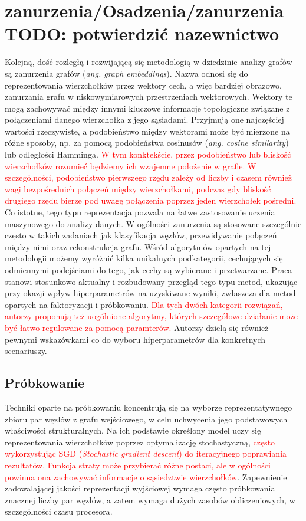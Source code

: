 \section{zanurzenia/Osadzenia/zanurzenia TODO: potwierdzić nazewnictwo}
    Kolejną, dość rozległą i rozwijającą się metodologią w dziedzinie analizy grafów są zanurzenia grafów (\emph{ang. graph embeddings}). Nazwa odnosi się do reprezentowania wierzchołków przez wektory cech, a więc bardziej obrazowo, zanurzania grafu w niskowymiarowych przestrzeniach wektorowych. Wektory te mogą zachowywać między innymi kluczowe informacje topologiczne związane z połączeniami danego wierzchołka z jego sąsiadami. Przyjmują one najczęściej wartości rzeczywiste, a podobieństwo między wektorami może być mierzone na różne sposoby, np.  za pomocą podobieństwa cosinusów (\emph{ang. cosine similarity}) lub odległości Hamminga\cite{Lian_Zheng_Zheng_Ge_Cao_Tsang_Xie_2018}. \textcolor{red}{W tym konktekście, przez podobieństwo lub bliskość wierzchołków rozumieć będziemy ich wzajemne położenie w grafie. W szczególności, podobieństwo pierwszego rzędu zależy od liczby i czasem również wagi bezpośrednich połączeń między wierzchołkami, podczas gdy bliskość drugiego rzędu bierze pod uwagę połączenia poprzez jeden wierzchołek pośredni.} Co istotne, tego typu reprezentacja pozwala na łatwe zastosowanie uczenia maszynowego do analizy danych. W ogólności zanurzenia są stosowane szczególnie często w takich zadaniach jak klasyfikacja węzłów, przewidywanie połączeń między nimi oraz rekonstrukcja grafu. Wśród algorytmów opartych na tej metodologii możemy wyróżnić kilka unikalnych podkategorii, cechujących się odmiennymi podejściami do tego, jak cechy są wybierane i przetwarzane. Praca \cite{Yang_Qu_Hussein_Rosso_Cudré-Mauroux_Liu_2023} stanowi stosunkowo aktualny i rozbudowany przegląd tego typu metod, ukazując przy okazji wpływ hiperparametrów na uzyskiwane wyniki, zwłaszcza dla metod opartych na faktoryzacji i próbkowaniu. \textcolor{red}{Dla tych dwóch kategorii rozwiązań, autorzy proponują też uogólnione algorytmy, których szczegółowe działanie może być łatwo regulowane za pomocą paramterów.} Autorzy dzielą się również pewnymi wskazówkami co do wyboru hiperparametrów dla konkretnych scenariuszy. 

    \subsection{Próbkowanie}
        Techniki oparte na próbkowaniu koncentrują się na wyborze reprezentatywnego zbioru par węzłów z grafu wejściowego, w celu uchwycenia jego podstawowych właściwości strukturalnych. Na ich podstawie określony model uczy się reprezentowania wierzchołków poprzez optymalizację stochastyczną, \textcolor{red}{często wykorzystując SGD (\emph{Stochastic gradient descent}) do iteracyjnego poprawiania rezultatów. Funkcja straty może przybierać różne postaci, ale w ogólności powinna ona zachowywać informacje o sąsiedztwie wierzchołków}. Zapewnienie zadowalającej jakości reprezentacji wyjściowej wymaga często próbkowania znacznej liczby par węzłów, a zatem wymaga dużych zasobów obliczeniowych, w szczególności czasu procesora.
            
